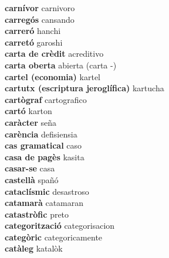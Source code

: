 \textbf{ carnívor  } carnivoro \\
\textbf{ carregós  } cansando \\
\textbf{ carreró  } hanchi \\
\textbf{ carretó  } garoshi \\
\textbf{ carta de crèdit  } acreditivo \\
\textbf{ carta oberta  } abierta (carta -) \\
\textbf{ cartel (economia)  } kartel \\
\textbf{ cartutx (escriptura jeroglífica)  } kartucha \\
\textbf{ cartògraf  } cartografico \\
\textbf{ cartó  } karton \\
\textbf{ caràcter  } seña \\
\textbf{ carència  } defisiensia \\
\textbf{ cas gramatical  } caso \\
\textbf{ casa de pagès  } kasita \\
\textbf{ casar-se  } casa \\
\textbf{ castellà  } spañó \\
\textbf{ cataclísmic  } desastroso \\
\textbf{ catamarà  } catamaran \\
\textbf{ catastròfic  } preto \\
\textbf{ categorització  } categorisacion \\
\textbf{ categòric  } categoricamente \\
\textbf{ catàleg  } katalòk \\
